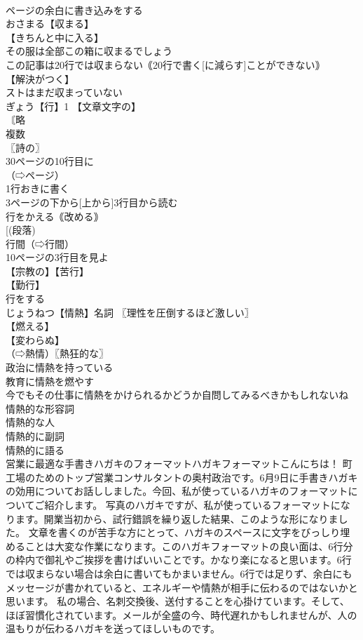 \documentclass[8pt]{extreport}
\begin{document}
\begin{CJK}{UTF8}{min}
\\	ページの余白に書き込みをする 
\\	おさまる【収まる】 
\\	【きちんと中に入る】 
\\	その服は全部この箱に収まるでしょう 
\\	この記事は20行では収まらない｟20行で書く[に減らす]ことができない｠ 
\\	【解決がつく】 
\\	ストはまだ収まっていない 
\\	ぎょう【行】1 【文章文字の】
\\	〘略 
\\	複数
\\	〖詩の〗
\\	30ページの10行目に
\\	（⇨ページ）
\\	1行おきに書く
\\	3ページの下から[上から]3行目から読む
\\	行をかえる｟改める｠
\\	[(段落) 
\\	行間（⇨行間）
\\	10ページの3行目を見よ
\\	【宗教の】【苦行】
\\	【勤行】
\\	行をする
\\	じょうねつ【情熱】名詞 〖理性を圧倒するほど激しい〗
\\	【燃える】
\\	【変わらぬ】
\\	（⇨熱情）〖熱狂的な〗
\\	政治に情熱を持っている 
\\	教育に情熱を燃やす 
\\	今でもその仕事に情熱をかけられるかどうか自問してみるべきかもしれないね 
\\	情熱的な形容詞 
\\	情熱的な人 
\\	情熱的に副詞 
\\	情熱的に語る 
\\	営業に最適な手書きハガキのフォーマットハガキフォーマットこんにちは！ 町工場のためのトップ営業コンサルタントの奥村政治です。6月9日に手書きハガキの効用についてお話ししました。今回、私が使っているハガキのフォーマットについてご紹介します。 写真のハガキですが、私が使っているフォーマットになります。開業当初から、試行錯誤を繰り返した結果、このような形になりました。 文章を書くのが苦手な方にとって、ハガキのスペースに文字をびっしり埋めることは大変な作業になります。このハガキフォーマットの良い面は、6行分の枠内で御礼やご挨拶を書けばいいことです。かなり楽になると思います。6行では収まらない場合は余白に書いてもかまいません。6行では足りず、余白にもメッセージが書かれていると、エネルギーや情熱が相手に伝わるのではないかと思います。 私の場合、名刺交換後、送付することを心掛けています。そして、ほぼ習慣化されています。メールが全盛の今、時代遅れかもしれませんが、人の温もりが伝わるハガキを送ってほしいものです。

\end{CJK}
\end{document}
